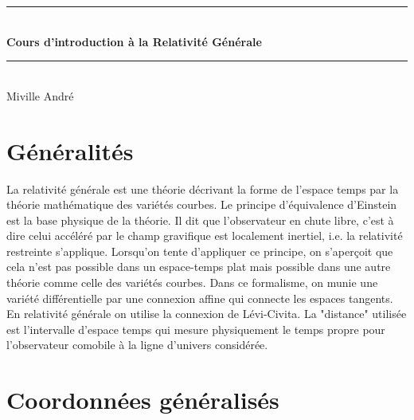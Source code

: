 \documentclass[10pt, a4paper]{report}
\numberwithin{equation}{subsection}
\begin{document}
\begin{titlepage}

\begin{center}


\rule{\linewidth}{0.3mm} \\[0.4cm]
{ \huge \bfseries\color{blue!70!black} Cours d'introduction à la Relativité Générale\\[0.4cm] }
\rule{\linewidth}{0.3mm} \\[0.4cm]
\Large Miville André
\normalsize

\vfill


\end{center}
\end{titlepage}







\renewcommand{\contentsname}{Sommaire}
\renewcommand{\bibname}{Références}



\tableofcontents


\section{Généralités}
La relativité générale est une théorie décrivant la forme de l'espace temps par la théorie mathématique des variétés courbes. Le principe d'équivalence d'Einstein est la base physique de la théorie. Il dit que l'observateur en chute libre, c'est à dire celui accéléré par le champ gravifique est localement inertiel, i.e. la relativité restreinte s'applique. Lorsqu'on tente d'appliquer ce principe, on s'aperçoit que cela n'est pas possible dans un espace-temps plat mais possible dans une autre théorie comme celle des variétés courbes. Dans ce formalisme, on munie une variété différentielle par une connexion affine qui connecte les espaces tangents. En relativité générale on utilise la connexion de Lévi-Civita. La "distance" utilisée est l'intervalle d'espace temps qui mesure physiquement le temps propre pour l'observateur comobile à la ligne d'univers considérée. 

\section{Coordonnées généralisés}
\end{document}
